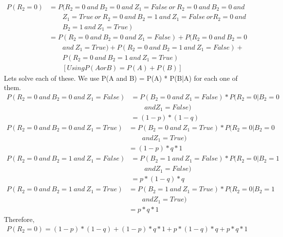 \documentclass[12pt]{article}
\begin{document}
\begin{align}
P(R_2 = 0) & = P(R_2 = 0\ and\ B_2 = 0\ and\ Z_1 = False\ or\ R_2 = 0\ and\ B_2 = 0\  and\ \nonumber \\
& \qquad Z_1 = True\ or\ R_2 = 0\ and\ B_2 = 1\ and\ Z_1 = False\ or R_2 = 0\ and\ \nonumber \\ 
& \qquad B_2 = 1\ and\ Z_1 = True\ )  \nonumber \\
& = P(R_2 = 0\ and\ B_2 = 0\ and\ Z_1 = False) +  P(R_2 = 0\ and\ B_2 = 0\ \nonumber \\
& \qquad and\ Z_1 = True) +  P(R_2 = 0\ and\ B_2 = 1\ and\ Z_1 = False) +  \nonumber \\
& \qquad P(R_2 = 0\ and\ B_2 = 1\ and\ Z_1 = True) \nonumber \\
& \qquad [Using P(A or B) = P(A) + P(B)] \nonumber
\end{align}
Lets solve each of these. We use P(A and B) = P(A) * P(B|A) for each one of them.\\
\begin{align}
P(R_2 = 0\ and\ B_2 = 0\ and\ Z_1 = False) & = P(B_2 = 0\ and\ Z_1 = False) * P(R_2 = 0 | B_2 = 0 \nonumber \\
&  \qquad and Z_1 = False \nonumber) \\
& = (1-p) * (1-q) \nonumber
\end{align}
\begin{align}
P(R_2 = 0\ and\ B_2 = 0\ and\ Z_1 = True) & = P(B_2 = 0\ and\ Z_1 = True) * P(R_2 = 0 | B_2 = 0 \nonumber \\
&  \qquad and Z_1 = True \nonumber) \\
& = (1-p)*q*1 \nonumber
\end{align}
\begin{align}
P(R_2 = 0\ and\ B_2 = 1\ and\ Z_1 = False) & = P(B_2 = 1\ and\ Z_1 = False) * P(R_2 = 0 | B_2 = 1 \nonumber \\
&  \qquad and Z_1 = False \nonumber) \\
& = p*(1-q)*q \nonumber
\end{align}
\begin{align}
P(R_2 = 0\ and\ B_2 = 1\ and\ Z_1 = True) & = P(B_2 = 1\ and\ Z_1 = True) * P(R_2 = 0 | B_2 = 1 \nonumber \\
&  \qquad and Z_1 = True \nonumber) \\
& = p*q*1 \nonumber
\end{align}
Therefore,
\begin{align}
P(R_2 = 0) = (1-p) * (1-q) + (1-p)*q*1 + p*(1-q)*q + p*q*1 \nonumber
\end{align}
\end{document}
